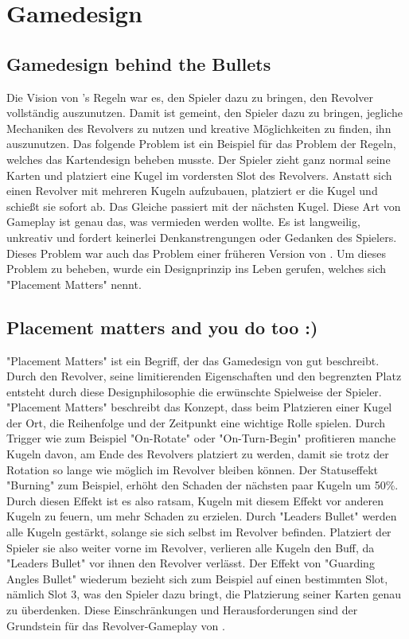 
\section{Gamedesign}\label{sec:differenzierung}

\renewcommand{\kapitelautor}{Autor: Philip Jankovic} %


\subsection{Gamedesign behind the Bullets}\label{subsec:gamedesignBehindBullets}

Die Vision von \FF's Regeln war es, den Spieler dazu zu bringen, den Revolver vollständig auszunutzen. Damit ist gemeint,
den Spieler dazu zu bringen, jegliche Mechaniken des Revolvers zu nutzen und kreative Möglichkeiten zu finden, ihn auszunutzen.
Das folgende Problem ist ein Beispiel für das Problem der \FF Regeln, welches das Kartendesign beheben musste.
Der Spieler zieht ganz normal seine Karten und platziert eine Kugel im vordersten Slot des Revolvers.
Anstatt sich einen Revolver mit mehreren Kugeln aufzubauen, platziert er die Kugel und schießt sie sofort ab.
Das Gleiche passiert mit der nächsten Kugel. Diese Art von Gameplay ist genau das, was vermieden werden wollte.
Es ist langweilig, unkreativ und fordert keinerlei Denkanstrengungen oder Gedanken des Spielers.
Dieses Problem war auch das Problem einer früheren Version von \FF. Um dieses Problem zu beheben, wurde ein Designprinzip
ins Leben gerufen, welches sich "Placement Matters" nennt.


\subsection{Placement matters and you do too :)}\label{subsec:placementMatters}

"Placement Matters" ist ein Begriff, der das Gamedesign von \FF gut beschreibt. Durch den Revolver, seine limitierenden
Eigenschaften und den begrenzten Platz entsteht durch diese Designphilosophie die erwünschte Spielweise der Spieler.
"Placement Matters" beschreibt das Konzept, dass beim Platzieren einer Kugel der Ort, die Reihenfolge und der Zeitpunkt
eine wichtige Rolle spielen. Durch Trigger wie zum Beispiel "On-Rotate" oder "On-Turn-Begin" profitieren manche Kugeln davon,
am Ende des Revolvers platziert zu werden, damit sie trotz der Rotation so lange wie möglich im Revolver bleiben können.
Der Statuseffekt "Burning" zum Beispiel, erhöht den Schaden der nächsten paar Kugeln um 50\%.
Durch diesen Effekt ist es also ratsam, Kugeln mit diesem Effekt vor anderen Kugeln zu feuern, um mehr Schaden zu erzielen.
Durch "Leaders Bullet" werden alle Kugeln gestärkt, solange sie sich selbst im Revolver befinden. Platziert der Spieler sie also
weiter vorne im Revolver, verlieren alle Kugeln den Buff, da "Leaders Bullet" vor ihnen den Revolver verlässt.
Der Effekt von "Guarding Angles Bullet" wiederum bezieht sich zum Beispiel auf einen bestimmten Slot, nämlich Slot 3,
was den Spieler dazu bringt, die Platzierung seiner Karten genau zu überdenken. Diese Einschränkungen und Herausforderungen
sind der Grundstein für das Revolver-Gameplay von \FF.


